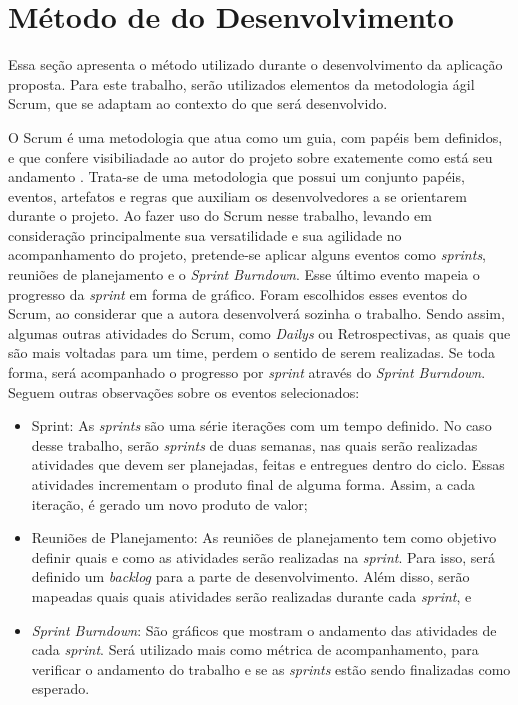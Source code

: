 \section{Método de do Desenvolvimento}\label{sec:metdev}

Essa seção apresenta o método utilizado durante o desenvolvimento da aplicação proposta. Para este trabalho, serão utilizados 
elementos da metodologia ágil Scrum, que se adaptam ao contexto do que será desenvolvido.

O Scrum é uma metodologia que atua como um guia, com papéis bem definidos, e que confere visibiliadade ao autor do projeto 
sobre exatemente como está seu andamento \cite{pereira2007entendendo}. Trata-se de uma metodologia que possui um 
conjunto papéis, eventos, artefatos e regras que auxiliam os desenvolvedores a se orientarem durante o projeto. Ao 
fazer uso do Scrum nesse trabalho, levando em consideração principalmente sua versatilidade e sua agilidade no acompanhamento do 
projeto, pretende-se aplicar alguns eventos como \textit{sprints}, reuniões de planejamento e o 
\textit{Sprint Burndown}. Esse último evento mapeia o progresso da \textit{sprint} em forma de gráfico. Foram escolhidos esses 
eventos do Scrum, ao considerar que a autora desenvolverá sozinha o trabalho. Sendo assim, algumas outras atividades do 
Scrum, como \textit{Dailys} ou Retrospectivas, as quais que são mais voltadas para um time, perdem o sentido de serem 
realizadas. Se toda forma, será acompanhado o progresso por \textit{sprint} através do \textit{Sprint Burndown}. Seguem outras observações 
sobre os eventos selecionados:

\begin{itemize}
    \item Sprint: As \textit{sprints} são uma série iterações com um tempo definido. No caso desse trabalho, serão 
    \textit{sprints} de duas semanas, nas quais serão realizadas atividades que devem ser planejadas, feitas e 
    entregues dentro do ciclo. Essas atividades incrementam
    o produto final de alguma forma. Assim, a cada iteração, é gerado um novo produto de valor;   
    \item Reuniões de Planejamento: As reuniões de planejamento tem como objetivo definir quais e como as atividades 
    serão realizadas na \textit{sprint}. Para isso, será definido um \textit{backlog} para a parte de desenvolvimento. 
    Além disso, serão mapeadas quais quais atividades serão realizadas durante cada \textit{sprint}, e
    \item \textit{Sprint Burndown}: São gráficos que mostram o andamento das atividades de cada \textit{sprint}. Será utilizado mais como
    métrica de acompanhamento, para verificar o andamento do trabalho e se as \textit{sprints} estão sendo finalizadas como esperado.
\end{itemize}

